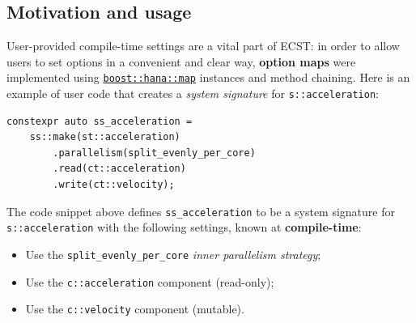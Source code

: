 \documentclass[twoside, 12pt, a4paper, openany]{book}
\begin{document}
\subsection{Motivation and usage}\label{motivation-and-usage-1}

User-provided compile-time settings are a vital part of ECST: in order
to allow users to set options in a convenient and clear way,
\textbf{option maps} were implemented using
\href{http://www.boost.org/doc/libs/1_61_0/libs/hana/doc/html/structboost_1_1hana_1_1map.html}{\texttt{boost::hana::map}}
instances and method chaining. Here is an example of user code that
creates a \emph{system signature} for
\texttt{s::acceleration}:

\begin{verbatim}
constexpr auto ss_acceleration =
    ss::make(st::acceleration)
        .parallelism(split_evenly_per_core)
        .read(ct::acceleration)
        .write(ct::velocity);
\end{verbatim}

The code snippet above defines
\texttt{ss_acceleration}
to be a system signature for
\texttt{s::acceleration}
with the following settings, known at \textbf{compile-time}:

\begin{itemize}
\item
  Use the
  \texttt{split_evenly_per_core}
  \emph{inner parallelism strategy};
\item
  Use the
  \texttt{c::acceleration}
  component (read-only);
\item
  Use the
  \texttt{c::velocity}
  component (mutable).
\end{itemize}
\end{document}
